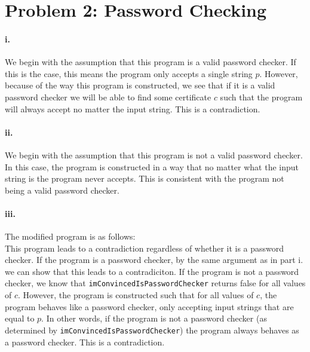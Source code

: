 \documentclass[10pt,letter]{article}
\begin{document}
\section*{Problem 2: Password Checking}

\paragraph{i.} We begin with the assumption that this program is a valid password checker. If this is the case, this means the program only accepts a single string $p$. However, because of the way this program is constructed, we see that if it is a valid password checker we will be able to find some certificate $c$ such that the program will always accept no matter the input string. This is a contradiction.

\paragraph{ii.} We begin with the assumption that this program is not a valid password checker. In this case, the program is constructed in a way that no matter what the input string is the program never accepts. This is consistent with the program not being a valid password checker.

\paragraph{iii.} The modified program is as follows:\\



This program leads to a contradiction regardless of whether it is a password checker. If the program is a password checker, by the same argument as in part i. we can show that this leads to a contradiciton. If the program is not a password checker, we know that \texttt{imConvincedIsPasswordChecker} returns false for all values of $c$. However, the program is constructed such that for all values of $c$, the program behaves like a password checker, only accepting input strings that are equal to $p$. In other words, if the program is not a password checker (as determined by \texttt{imConvincedIsPasswordChecker}) the program always behaves as a password checker. This is a contradiction. 
\end{document}
